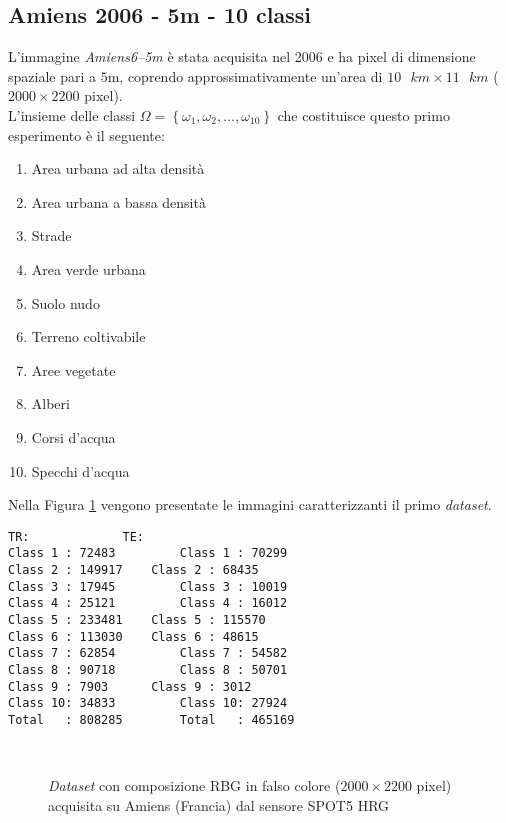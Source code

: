 \subsection{Amiens 2006 - 5m - 10 classi}
L'immagine \emph{Amiens6--5m} è stata acquisita nel 2006 e ha pixel di dimensione spaziale pari a $5 \text{m}$, coprendo approssimativamente un'area di $10\text{ }km\times11\text{ }km$ ($2000\times2200$ pixel).\\
L'insieme delle classi $\Omega=\left\lbrace\omega_1,\omega_2,\ldots,\omega_{10}\right\rbrace$ che costituisce questo primo esperimento è il seguente:
\begin{enumerate}
\item Area urbana ad alta densità
\item Area urbana a bassa densità
\item Strade
\item Area verde urbana 
\item Suolo nudo
\item Terreno coltivabile
\item Aree vegetate
\item Alberi
\item Corsi d'acqua
\item Specchi d'acqua
\end{enumerate}
Nella Figura \ref{fig: Amiens65m} vengono presentate le immagini caratterizzanti il primo \emph{dataset}. 
\begin{lstlisting}[float=b,title={Distribuzione dei pixel di training (TR) e test (TE) classe per classe.},
                   label=lst:esempio, frame=lines]
TR:				TE:
Class 1 : 72483 		Class 1 : 70299
Class 2 : 149917 	Class 2 : 68435
Class 3 : 17945 		Class 3 : 10019
Class 4 : 25121 		Class 4 : 16012
Class 5 : 233481 	Class 5 : 115570
Class 6 : 113030 	Class 6 : 48615
Class 7 : 62854 		Class 7 : 54582
Class 8 : 90718 		Class 8 : 50701
Class 9 : 7903 		Class 9 : 3012
Class 10: 34833 		Class 10: 27924
Total   : 808285		Total   : 465169
\end{lstlisting}
\clearpage
\begin{figure}[!ht]
   \center
   \\%
     \hspace{4mm}
    \caption{\emph{Dataset} con composizione RBG in falso colore ($2000\times2200$ pixel) acquisita su Amiens (Francia) dal sensore \textsc{SPOT5 HRG}}
    \label{fig: Amiens65m}
  \end{figure}
  
